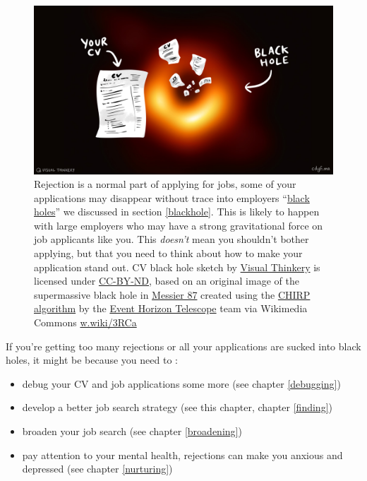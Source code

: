 \documentclass[
]{book}
\providecommand{\tightlist}{%
  \setlength{\itemsep}{0pt}\setlength{\parskip}{0pt}}
\begin{document}
\begin{figure}

{\centering \includegraphics[width=0.98\linewidth]{images/Black-hole-CV} 

}

\caption{Rejection is a normal part of applying for jobs, some of your applications may disappear without trace into employers ``\href{https://en.wikipedia.org/wiki/Black_hole}{black holes}'' we discussed in section \ref{blackhole}. This is likely to happen with large employers who may have a strong gravitational force on job applicants like you. This \emph{doesn't} mean you shouldn't bother applying, but that you need to think about how to make your application stand out. CV black hole sketch by \href{https://visualthinkery.com/}{Visual Thinkery} is licensed under \href{https://creativecommons.org/licenses/by-nd/4.0/}{CC-BY-ND}, based on an original image of the supermassive black hole in \href{https://en.wikipedia.org/wiki/Messier_87}{Messier 87} created using the \href{https://en.wikipedia.org/wiki/CHIRP_(algorithm)}{CHIRP algorithm} by the \href{https://en.wikipedia.org/wiki/Event_Horizon_Telescope}{Event Horizon Telescope} team via Wikimedia Commons \href{https://w.wiki/3RCa}{w.wiki/3RCa}}\label{fig:blackhole-fig}
\end{figure}



If you're getting too many rejections or all your applications are sucked into black holes, it might be because you need to :

\begin{itemize}
\tightlist
\item
  debug your CV and job applications some more (see chapter \ref{debugging})
\item
  develop a better job search strategy (see this chapter, chapter \ref{finding})
\item
  broaden your job search (see chapter \ref{broadening})
\item
  pay attention to your mental health, rejections can make you anxious and depressed (see chapter \ref{nurturing})
\end{itemize}
\end{document}
